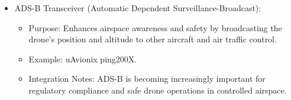 \begin{itemize}
\item ADS-B Transceiver (Automatic Dependent Surveillance-Broadcast):
\begin{itemize}
\item Purpose: Enhances airspace awareness and safety by broadcasting the drone's position and altitude to other aircraft and air traffic control.

\item Example: uAvionix ping200X.

\item Integration Notes: ADS-B is becoming increasingly important for regulatory compliance and safe drone operations in controlled airspace.
\end{itemize}
\end{itemize}

